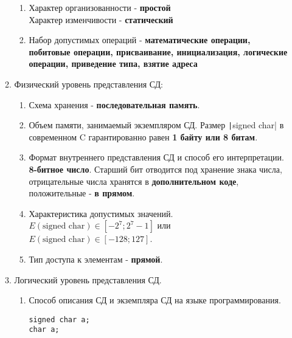 \documentclass[a4paper,14pt]{extarticle}
\begin{document}
\begin{enumerate}
\begin{enumerate}[label*=\arabic*.]
		            \begin{enumerate}[label*=\arabic*.]
			            \item Характер организованности - \textbf{простой}\\
			                  Характер изменчивости - \textbf{статический}
			            \item Набор допустимых операций - \textbf{математические операции, побитовые операции, присваивание, инициализация, логические операции,
				                  приведение типа, взятие адреса}
		            \end{enumerate}

		      \item Физический уровень представления СД:

		            \begin{enumerate}[label*=\arabic*.]
			            \item Схема хранения - \textbf{последовательная память}.
			            \item Объем памяти, занимаемый экземпляром СД.
			                  Размер \texttt|signed char| в современном C гарантированно равен \textbf{1 байту или 8 битам}.
			            \item Формат внутреннего представления СД и способ его интерпретации.
			                  \textbf{8-битное число}. Старший бит отводится под хранение знака числа, отрицательные числа
			                  хранятся в \textbf{дополнительном коде}, положительные - \textbf{в прямом}.
			            \item Характеристика допустимых значений.
			                  $E(\text{signed char}) \in [-2^7; 2^7 - 1]$ или
			                  $E(\text{signed char}) \in [-128; 127]$.
			            \item Тип доступа к элементам - \textbf{прямой}.
		            \end{enumerate}

		      \item Логический уровень представления СД.
		            \begin{enumerate}[label*=\arabic*.]
			            \item Способ описания СД и экземпляра СД на языке программирования.
			                  \begin{verbatim}
signed char a;
char a;
					  \end{verbatim}
		            \end{enumerate}
	      \end{enumerate}


\end{enumerate}
\end{document}
